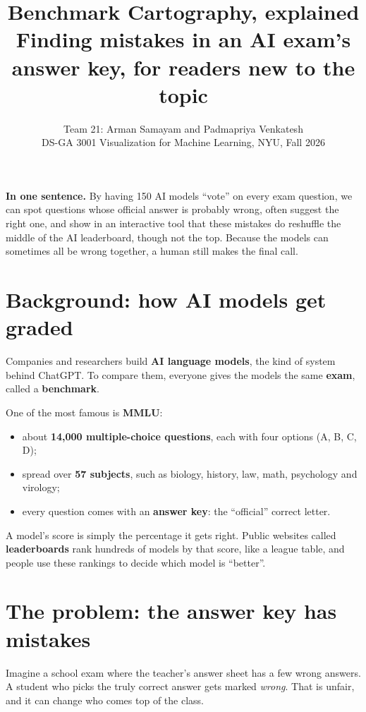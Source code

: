 \documentclass[11pt]{article}
\title{\textbf{Benchmark Cartography, explained}\\[2pt]
\large Finding mistakes in an AI exam's answer key, for readers new to the topic}
\author{Team 21: Arman Samayam and Padmapriya Venkatesh\\
\small DS-GA 3001 Visualization for Machine Learning, NYU, Fall 2026}
\date{}
\newcommand{\keybox}[1]{\par\smallskip\noindent\colorbox{boxbg}{\parbox{\dimexpr\linewidth-2\fboxsep}{\vspace{3pt}#1\vspace{3pt}}}\par\smallskip}
\begin{document}
\maketitle
\vspace{-2em}

\keybox{\textbf{In one sentence.} By having 150 AI models ``vote'' on every exam question, we can
spot questions whose official answer is probably wrong, often suggest the right one, and show in an
interactive tool that these mistakes do reshuffle the middle of the AI leaderboard, though not the
top. Because the models can sometimes all be wrong together, a human still makes the final call.}

\section{Background: how AI models get graded}

Companies and researchers build \textbf{AI language models}, the kind of system behind ChatGPT. To
compare them, everyone gives the models the same \textbf{exam}, called a \textbf{benchmark}.

One of the most famous is \textbf{MMLU}:
\begin{itemize}
  \item about \textbf{14,000 multiple-choice questions}, each with four options (A, B, C, D);
  \item spread over \textbf{57 subjects}, such as biology, history, law, math, psychology and virology;
  \item every question comes with an \textbf{answer key}: the ``official'' correct letter.
\end{itemize}
A model's score is simply the percentage it gets right. Public websites called
\textbf{leaderboards} rank hundreds of models by that score, like a league table, and people use
these rankings to decide which model is ``better''.

\section{The problem: the answer key has mistakes}

Imagine a school exam where the teacher's answer sheet has a few wrong answers. A student who picks
the truly correct answer gets marked \emph{wrong}. That is unfair, and it can change who comes top of
the class.
\end{document}
